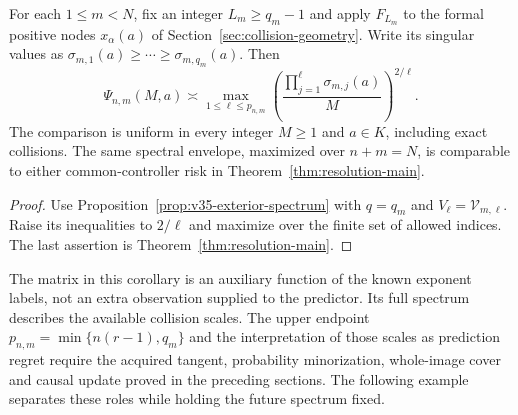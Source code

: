 \begin{corollary}
\label{cor:v35-spectral-envelope}
For each $1\le m<N$, fix an integer $L_m\ge q_m-1$ and apply
$F_{L_m}$ to the formal positive nodes $x_\alpha(a)$ of
Section~\ref{sec:collision-geometry}. Write its singular values as
$\sigma_{m,1}(a)\ge\cdots\ge\sigma_{m,q_m}(a)$. Then
\begin{equation}\label{eq:v35-spectral-envelope}
 \Psi_{n,m}(M,a)\asymp
 \max_{1\le\ell\le p_{n,m}}
    \left(\frac{\prod_{j=1}^{\ell}\sigma_{m,j}(a)}{M}\right)^{2/\ell}.
\end{equation}
The comparison is uniform in every integer $M\ge1$ and $a\in K$,
including exact collisions. The same spectral envelope, maximized
over $n+m=N$, is comparable to either common-controller risk in
Theorem~\ref{thm:resolution-main}.
\end{corollary}
\begin{proof}
Use Proposition~\ref{prop:v35-exterior-spectrum} with
$q=q_m$ and $V_\ell=\mathcal V_{m,\ell}$. Raise its inequalities
to $2/\ell$ and maximize over the finite set of allowed indices.
The last assertion is Theorem~\ref{thm:resolution-main}.
\end{proof}

The matrix in this corollary is an auxiliary function of the known
exponent labels, not an extra observation supplied to the predictor.
Its full spectrum describes the available collision scales. The
upper endpoint $p_{n,m}=\min\{n(r-1),q_m\}$ and the interpretation
of those scales as prediction regret require the acquired tangent,
probability minorization, whole-image cover and causal update proved
in the preceding sections. The following example separates these
roles while holding the future spectrum fixed.

